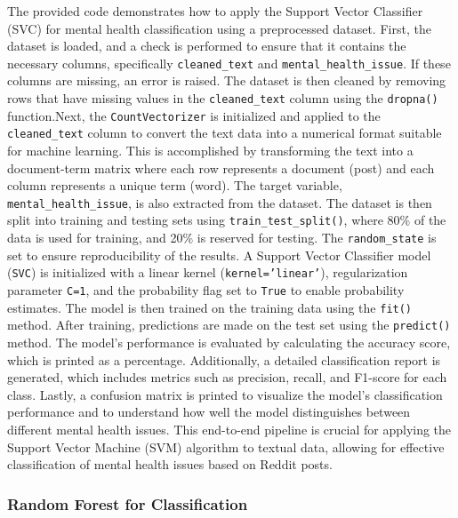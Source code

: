 \noindent
The provided code demonstrates how to apply the Support Vector Classifier (SVC) for mental health classification using a preprocessed dataset. First, the dataset is loaded, and a check is performed to ensure that it contains the necessary columns, specifically \texttt{cleaned\_text} and \texttt{mental\_health\_issue}. If these columns are missing, an error is raised. The dataset is then cleaned by removing rows that have missing values in the \texttt{cleaned\_text} column using the \texttt{dropna()} function.Next, the \texttt{CountVectorizer} is initialized and applied to the \texttt{cleaned\_text} column to convert the text data into a numerical format suitable for machine learning. This is accomplished by transforming the text into a document-term matrix where each row represents a document (post) and each column represents a unique term (word). The target variable, \texttt{mental\_health\_issue}, is also extracted from the dataset. The dataset is then split into training and testing sets using \texttt{train\_test\_split()}, where 80\% of the data is used for training, and 20\% is reserved for testing. The \texttt{random\_state} is set to ensure reproducibility of the results. A Support Vector Classifier model (\texttt{SVC}) is initialized with a linear kernel (\texttt{kernel='linear'}), regularization parameter \texttt{C=1}, and the probability flag set to \texttt{True} to enable probability estimates. The model is then trained on the training data using the \texttt{fit()} method. After training, predictions are made on the test set using the \texttt{predict()} method. The model's performance is evaluated by calculating the accuracy score, which is printed as a percentage. Additionally, a detailed classification report is generated, which includes metrics such as precision, recall, and F1-score for each class. Lastly, a confusion matrix is printed to visualize the model's classification performance and to understand how well the model distinguishes between different mental health issues. This end-to-end pipeline is crucial for applying the Support Vector Machine (SVM) algorithm to textual data, allowing for effective classification of mental health issues based on Reddit posts.

\subsubsection{Random Forest for Classification}

